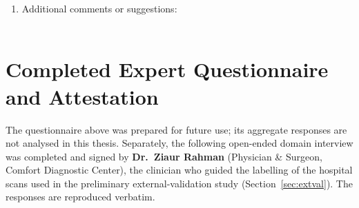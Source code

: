 \begin{enumerate}[resume]
\item Additional comments or suggestions:\\[0.3cm]
\underline{\hspace{10cm}}\\[0.3cm]
\underline{\hspace{10cm}}
\end{enumerate}

\vspace{0.6cm}
\section*{Completed Expert Questionnaire and Attestation}
\noindent The questionnaire above was prepared for future use; its aggregate responses are not analysed in this thesis. Separately, the following open-ended domain interview was completed and signed by \textbf{Dr.\ Ziaur Rahman} (Physician \& Surgeon, Comfort Diagnostic Center), the clinician who guided the labelling of the hospital scans used in the preliminary external-validation study (Section~\ref{sec:extval}). The responses are reproduced verbatim.

